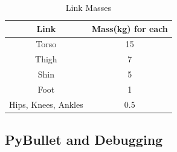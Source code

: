 \documentclass[12pt, a4paper]{article}
\begin{document}
\begin{table}[ht]
\caption{Link Masses}
\begin{center}
\begin{tabular}{|c|c|}
\hline
Link & Mass(kg) for each\\
\hline
Torso & 15\\
\hline
Thigh & 7\\
\hline
Shin  & 5\\
\hline
Foot & 1\\
\hline
Hips, Knees, Ankles & 0.5\\
\hline
\end{tabular}
\end{center}
\label{tbl:link masses}
\end{table}

\subsection{PyBullet and Debugging}
\end{document}
